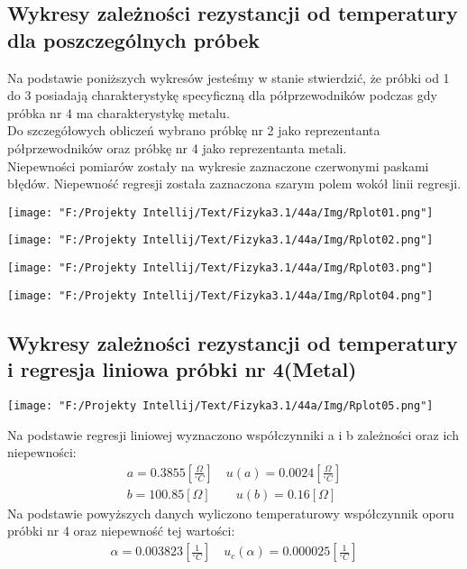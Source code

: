 \documentclass[11pt]{article}
\begin{document}
    \subsection*{Wykresy zależności rezystancji od temperatury dla poszczególnych próbek}
    \indent Na podstawie poniższych wykresów jesteśmy w stanie stwierdzić, że próbki od 1 do 3 posiadają charakterystykę
    specyficzną dla półprzewodników podczas gdy próbka nr 4 ma charakterystykę metalu.\\
    \indent Do szczegółowych obliczeń wybrano próbkę nr 2 jako reprezentanta półprzewodników oraz
    próbkę nr 4 jako reprezentanta metali.\\
    \indent Niepewności pomiarów zostały na wykresie zaznaczone czerwonymi paskami błędów. Niepewność regresji została zaznaczona
    szarym polem wokół linii regresji.
    \begin{center}
        \texttt{[image: "F:/Projekty Intellij/Text/Fizyka3.1/44a/Img/Rplot01.png"]}
    \end{center}
    \begin{center}
        \texttt{[image: "F:/Projekty Intellij/Text/Fizyka3.1/44a/Img/Rplot02.png"]}
    \end{center}
    \begin{center}
        \texttt{[image: "F:/Projekty Intellij/Text/Fizyka3.1/44a/Img/Rplot03.png"]}
    \end{center}
    \begin{center}
        \texttt{[image: "F:/Projekty Intellij/Text/Fizyka3.1/44a/Img/Rplot04.png"]}
    \end{center}

    \subsection*{Wykresy zależności rezystancji od temperatury i regresja liniowa próbki nr 4(Metal)}
    \begin{center}
        \texttt{[image: "F:/Projekty Intellij/Text/Fizyka3.1/44a/Img/Rplot05.png"]}
    \end{center}
    Na podstawie regresji liniowej wyznaczono współczynniki a i b zależności oraz ich niepewności:
    \begin{gather*}
        a=0.3855[\frac{\Omega}{^\circ C}]\quad u(a)=0.0024[\frac{\Omega}{^\circ C}]\\
        b=100.85[\Omega]\quad\quad u(b)=0.16[\Omega]
    \end{gather*}
    Na podstawie powyższych danych wyliczono temperaturowy współczynnik oporu próbki nr 4 oraz niepewność tej wartości:
    \begin{gather*}
        \alpha=0.003823[\frac{1}{^\circ C}]\quad u_c(\alpha)=0.000025[\frac{1}{^\circ C}]
    \end{gather*}
\end{document}
